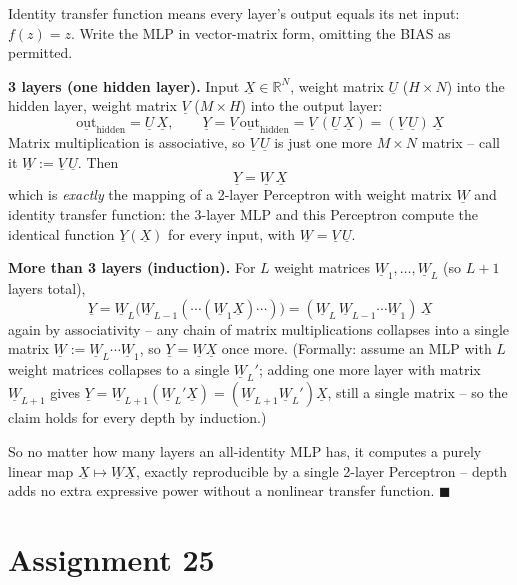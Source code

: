 \documentclass[11pt,a4paper]{article}
\begin{document}
Identity transfer function means every layer's output equals its net input: $f(z)=z$. Write the MLP in
vector-matrix form, omitting the BIAS as permitted.

\textbf{3 layers (one hidden layer).} Input $\underline X\in\mathbb R^N$, weight matrix
$\underline U$ ($H\times N$) into the hidden layer, weight matrix $\underline V$ ($M\times H$) into the
output layer:
\[
  \underline{\mathrm{out}}_{\text{hidden}} = \underline U\,\underline X, \qquad
  \underline Y = \underline V\,\underline{\mathrm{out}}_{\text{hidden}} = \underline V\,(\underline U\,\underline X) = (\underline V\,\underline U)\,\underline X
\]
Matrix multiplication is associative, so $\underline V\,\underline U$ is just one more $M\times N$
matrix -- call it $\underline W:=\underline V\,\underline U$. Then
\[
  \boxed{\underline Y = \underline W\,\underline X}
\]
which is \emph{exactly} the mapping of a 2-layer Perceptron with weight matrix $\underline W$ and
identity transfer function: the 3-layer MLP and this Perceptron compute the identical function
$\underline Y(\underline X)$ for every input, with $\underline W=\underline V\,\underline U$.

\textbf{More than 3 layers (induction).} For $L$ weight matrices $\underline{W}_1,\dots,\underline{W}_L$
(so $L+1$ layers total),
\[
  \underline Y = \underline{W}_L\big(\underline{W}_{L-1}(\cdots(\underline{W}_1\underline X)\cdots)\big)
  = (\underline{W}_L\,\underline{W}_{L-1}\cdots\underline{W}_1)\,\underline X
\]
again by associativity -- any chain of matrix multiplications collapses into a single matrix
$\underline W := \underline{W}_L\cdots\underline{W}_1$, so $\underline Y=\underline W\underline X$ once
more. (Formally: assume an MLP with $L$ weight matrices collapses to a single $\underline W_L'$; adding
one more layer with matrix $\underline W_{L+1}$ gives
$\underline Y=\underline W_{L+1}(\underline W_L'\underline X)=(\underline W_{L+1}\underline W_L')\underline X$,
still a single matrix -- so the claim holds for every depth by induction.)

So no matter how many layers an all-identity MLP has, it computes a purely linear map
$\underline X\mapsto\underline W\underline X$, exactly reproducible by a single 2-layer Perceptron --
depth adds no extra expressive power without a nonlinear transfer function. $\blacksquare$

\section*{Assignment 25}
\end{document}
